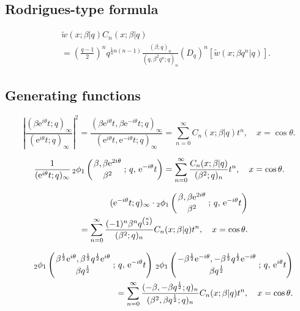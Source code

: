 \documentclass[envcountchap,graybox]{svmono}
\newcommand{\qhyp}[5]{\mbox{}_{#1}{\phi}_{#2}
\left(\genfrac{}{}{0pt}{}{#3}{#4}\,;\,q,\,#5\right)}
\newcommand{\e}{\textrm{e}}
\newcommand{\qhyp}[5]{\,\mbox{}_{#1}\phi_{#2}\!\left(
  \genfrac{}{}{0pt}{}{#3}{#4};#5\right)}
\begin{document}
\subsection*{Rodrigues-type formula}
\begin{eqnarray}
\label{RodContqUltra}
& &{\tilde w}(x;\beta|q)C_n(x;\beta|q)\nonumber\\
& &{}=\left(\frac{q-1}{2}\right)^n
q^{\frac{1}{4}n(n-1)}\frac{(\beta;q)_n}{(q,\beta^2q^n;q)_n}
\left(D_q\right)^n\left[{\tilde w}(x;\beta q^n|q)\right].
\end{eqnarray}

\subsection*{Generating functions}
\begin{equation}
\label{GenContqUltra1}
\left|\frac{(\beta\e^{i\theta}t;q)_{\infty}}{(\e^{i\theta}t;q)_{\infty}}\right|^2
=\frac{(\beta\e^{i\theta}t,\beta\e^{-i\theta}t;q)_{\infty}}
{(\e^{i\theta}t,\e^{-i\theta}t;q)_{\infty}}
=\sum_{n=0}^{\infty}C_n(x;\beta|q)t^n,\quad x=\cos\theta.
\end{equation}

\begin{equation}
\label{GenContqUltra2}
\frac{1}{(\e^{i\theta}t;q)_{\infty}}\,
\qhyp{2}{1}{\beta,\beta\e^{2i\theta}}{\beta^2}{\e^{-i\theta}t}
=\sum_{n=0}^{\infty}\frac{C_n(x;\beta|q)}{(\beta^2;q)_n}t^n,\quad x=\cos\theta.
\end{equation}

\begin{eqnarray}
\label{GenContqUltra3}
& &(\e^{-i\theta}t;q)_{\infty}\cdot
\qhyp{2}{1}{\beta,\beta\e^{2i\theta}}{\beta^2}{\e^{-i\theta}t}\nonumber\\
& &{}=\sum_{n=0}^{\infty}\frac{(-1)^n\beta^nq^{\binom{n}{2}}}{(\beta^2;q)_n}C_n(x;\beta|q)t^n,
\quad x=\cos\theta.
\end{eqnarray}

\begin{eqnarray}
\label{GenContqUltra4}
& &\qhyp{2}{1}{\beta^{\frac{1}{2}}\e^{i\theta},
\beta^{\frac{1}{2}}q^{\frac{1}{2}}\e^{i\theta}}{\beta q^{\frac{1}{2}}}{\e^{-i\theta}t}\,
\qhyp{2}{1}{-\beta^{\frac{1}{2}}\e^{-i\theta},
-\beta^{\frac{1}{2}}q^{\frac{1}{2}}\e^{-i\theta}}{\beta q^{\frac{1}{2}}}{\e^{i\theta}t}\nonumber\\
& &{}=\sum_{n=0}^{\infty}\frac{(-\beta,-\beta q^{\frac{1}{2}};q)_n}
{(\beta^2,\beta q^{\frac{1}{2}};q)_n}C_n(x;\beta|q)t^n,\quad x=\cos\theta.
\end{eqnarray}
\end{document}

